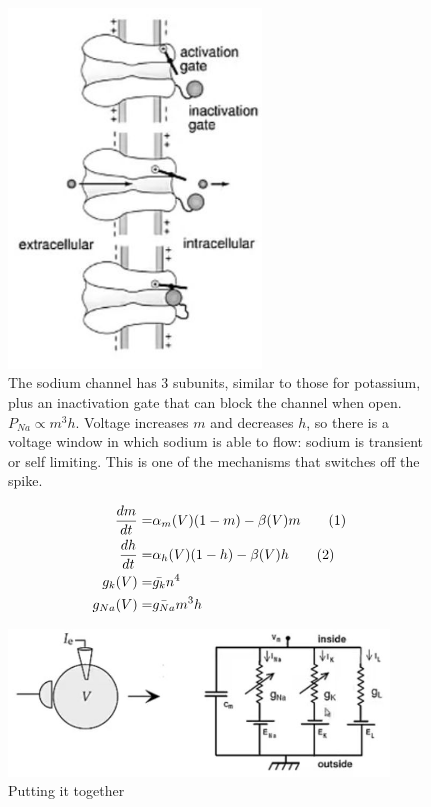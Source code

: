 \documentclass[]{article}
\newcommand\numberthis{\addtocounter{equation}{1}\tag{\theequation}}
\begin{document}
\begin{figure}[H]
	\begin{center}
		\caption[The sodium channel]{The sodium channel has 3 subunits, similar to those for potassium, plus an inactivation gate that can block the channel when open. $P_{Na}\propto m^3 h$. Voltage increases $m$ and decreases $h$, so there is a voltage window in which sodium is able to flow: sodium is transient or self limiting. This is one of the mechanisms that switches off the spike.}
	\includegraphics[width=0.6\textwidth]{na-channel}
	\end{center}
\end{figure}

\begin{align*}
	\frac{dm}{dt} =& \alpha_m(V)(1-m) - \beta(V)m \numberthis \label{eq:m}\\
	\frac{dh}{dt} =& \alpha_h(V)(1-h) - \beta(V)h\numberthis \label{eq:h} \\
	g_k(V) =& \bar{g_k} n^4\\
	g_{Na}(V)=& \bar{g_{Na}}m^3h
\end{align*}

\begin{figure}[H]
	\caption[Putting it together]{Putting it together}
	\includegraphics[width=0.9\textwidth]{putting-it-together}
\end{figure}
\end{document}
